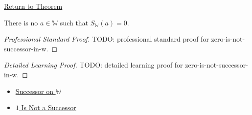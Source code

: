 \newpage
{}
\label{prf:zero-is-not-successor-in-w}

\begin{remark*}[Return]
\hyperref[thm:zero-is-not-successor-in-w]{Return to Theorem}
\end{remark*}

\begin{theorem*}
There is no $a\in\mathbb{W}$ such that $S_{\mathbb{W}}(a)=0$.
\end{theorem*}

\begin{proof}[Professional Standard Proof]
\LRAProofBodyStart
TODO: professional standard proof for zero-is-not-successor-in-w.
\end{proof}

\begin{proof}[Detailed Learning Proof]
\LRAProofBodyStart
TODO: detailed learning proof for zero-is-not-successor-in-w.
\end{proof}

\begin{remark*}
\end{remark*}

\begin{dependencies}
\begin{itemize}
  \item \hyperref[def:successor-on-w]{Successor on $\mathbb{W}$}
  \item \hyperref[ax:peano-base-not-successor]{$1$ Is Not a Successor}
\end{itemize}
\end{dependencies}

\clearpage
